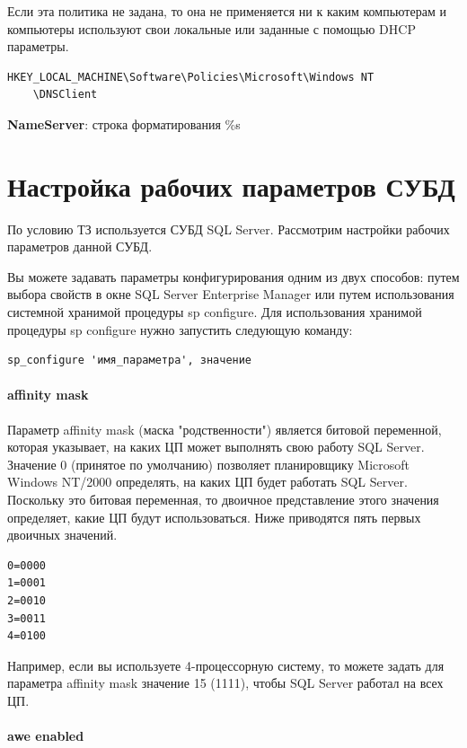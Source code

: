 \documentclass[russian,utf8,emptystyle]{eskdtext}
\begin{document}
Если эта политика не задана, то она не применяется ни к каким компьютерам и компьютеры используют свои локальные или заданные с помощью DHCP параметры.

\begin{verbatim}
HKEY_LOCAL_MACHINE\Software\Policies\Microsoft\Windows NT
    \DNSClient
\end{verbatim}

\textbf{NameServer}: строка форматирования \%s

\clearpage
\section{Настройка рабочих параметров СУБД}
По условию ТЗ используется СУБД SQL Server. Рассмотрим настройки рабочих параметров данной СУБД.

Вы можете задавать параметры конфигурирования одним из двух способов: путем выбора свойств в окне SQL Server Enterprise Manager или путем использования системной хранимой процедуры sp configure. Для использования хранимой процедуры sp configure нужно запустить следующую команду:

\begin{verbatim}
sp_configure 'имя_параметра', значение
\end{verbatim}

\paragraph{affinity mask}

Параметр affinity mask (маска "родственности") является битовой переменной, которая указывает, на каких ЦП может выполнять свою работу SQL Server. Значение 0 (принятое по умолчанию) позволяет планировщику Microsoft Windows NT/2000 определять, на каких ЦП будет работать SQL Server. Поскольку это битовая переменная, то двоичное представление этого значения определяет, какие ЦП будут использоваться. Ниже приводятся пять первых двоичных значений.
\begin{verbatim}
0=0000
1=0001
2=0010
3=0011
4=0100 
\end{verbatim}

Например, если вы используете 4-процессорную систему, то можете задать для параметра affinity mask значение 15 (1111), чтобы SQL Server работал на всех ЦП.


\paragraph{awe enabled}
\end{document}
